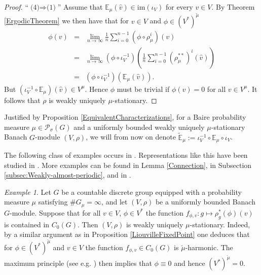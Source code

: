 \documentclass[a4paper,11pt,reqno]{amsart}
\numberwithin{equation}{section}
\theoremstyle{definition}
\theoremstyle{remark}
\newtheorem{example}[theorem]{Example}
\theoremstyle{remark}
\begin{document}
\begin{proof}
``$\text{(4)}\Rightarrow\text{(1)}$'' Assume that $\mathbb{E}_{\mu}(\widehat{v})\in\text{im}(\iota_{V})$ for every $v\in V$. By Theorem \ref{ErgodicTheorem} we then have that for $v\in V$ and $\phi\in(V^{\ast})^{\breve{\mu}}$ 
\begin{eqnarray*}
\phi(v) & = & \lim_{n\rightarrow\infty}\frac{1}{n}\sum_{i=0}^{n-1}\left(\phi\circ\rho_{\mu}^{i}\right)(v)\\
 & = & \lim_{n\rightarrow\infty}\left(\phi\circ\iota_{V}^{-1}\right)\left(\frac{1}{n}\sum_{i=0}^{n-1}(\rho_{\mu}^{\ast\ast})^{i}(\widehat{v})\right)\\
 & = & \left(\phi\circ\iota_{V}^{-1}\right)\left(\mathbb{E}_{\mu}(\widehat{v})\right).
\end{eqnarray*}
But $(\iota_{V}^{-1}\circ\mathbb{E}_{\mu})(\widehat{v})\in V^{\mu}$. Hence $\phi$ must be trivial if $\phi(v)=0$ for all $v\in V^{\mu}$. It follows that $\rho$ is weakly uniquely $\mu$-stationary. \end{proof}

Justified by Proposition \ref{EquivalentCharacterizations}, for a Baire probability measure $\mu\in\mathcal{P}_{\sigma}(G)$ and a uniformly bounded weakly uniquely $\mu$-stationary Banach $G$-module $(V,\rho)$, we will from now on denote $\widetilde{\mathbb{E}}_{\mu}:=\iota_{V}^{-1}\circ\mathbb{E}_{\mu}\circ\iota_{V}$.

The following class of examples occurs in \cite[Proposition 2.2]{JaworskiNeufang}. Representations like this have been studied in \cite{CTV08}. More examples can be found in Lemma \ref{Connection}, in Subsection \ref{subsec:Weakly-almost-periodic}, and in \cite[Section 2]{JaworskiNeufang}.

\begin{example} Let $G$ be a countable discrete group equipped with a probability measure $\mu$ satisfying $\#G_{\mu}=\infty$, and let $(V,\rho)$ be a uniformly bounded Banach $G$-module. Suppose that for all $v\in V$, $\phi\in V^{\ast}$ the function $f_{\phi,v}:g\mapsto\rho_{g}^{\ast}(\phi)(v)$ is contained in $C_{0}(G)$. Then $(V,\rho)$ is weakly uniquely $\mu$-stationary. Indeed, by a similar argument as in Proposition \ref{LiouvilleFixedPoint} one deduces that for $\phi\in(V^{\ast})^{\breve{\mu}}$ and $v\in V$ the function $f_{\phi,v}\in C_{0}(G)$ is $\breve{\mu}$-harmonic. The maximum principle (see e.g. \cite[Exercise 2.80]{Yadin24}) then implies that $\phi\equiv0$ and hence $(V^{\ast})^{\breve{\mu}}=0$. \end{example}
\end{document}
